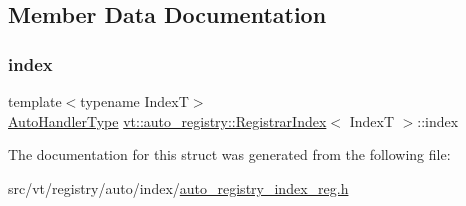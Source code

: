\subsection{Member Data Documentation}
\mbox{\label{structvt_1_1auto__registry_1_1_registrar_index_a1ad2ff12ac96ae55412937063a864703}} 
\subsubsection{\texorpdfstring{index}{index}}
{\footnotesize\ttfamily template$<$typename IndexT$>$ \\
\hyperlink{namespacevt_1_1auto__registry_ae295e18699146815bb7d7674594d95d7}{Auto\+Handler\+Type} \hyperlink{structvt_1_1auto__registry_1_1_registrar_index}{vt\+::auto\+\_\+registry\+::\+Registrar\+Index}$<$ IndexT $>$\+::index}



The documentation for this struct was generated from the following file\+:\begin{DoxyCompactItemize}
\item 
src/vt/registry/auto/index/\hyperlink{auto__registry__index__reg_8h}{auto\+\_\+registry\+\_\+index\+\_\+reg.\+h}\end{DoxyCompactItemize}
